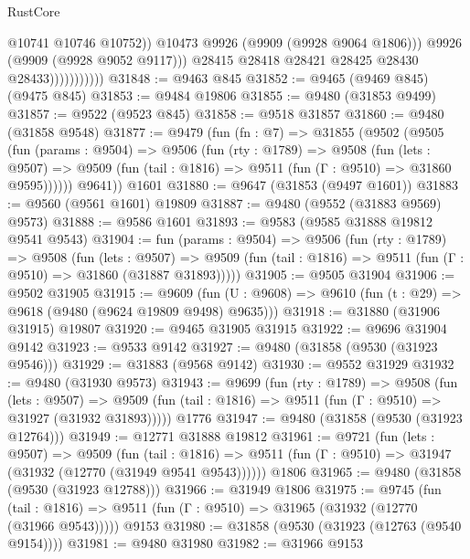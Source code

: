 \begin{lexlean}{RustCore}
\begin{coremodule}
                                  @10741
                                  @10746
                                  @10752))
                              @10473
                              @9926
                              (@9909 (@9928 @9064 @1806)))
                            @9926
                            (@9909 (@9928 @9052 @9117)))
                          @28415
                          @28418
                          @28421
                          @28425
                          @28430
                          @28433)))))))))))
@31848 := @9463 @845
@31852 := @9465 (@9469 @845) (@9475 @845)
@31853 := @9484 @19806
@31855 := @9480 (@31853 @9499)
@31857 := @9522 (@9523 @845)
@31858 := @9518 @31857
@31860 := @9480 (@31858 @9548)
@31877 := @9479
    (fun (fn : @7) =>
    @31855
      (@9502
        (@9505
          (fun (params : @9504) =>
          @9506
            (fun (rty : @1789) =>
            @9508
              (fun (lets : @9507) =>
              @9509 (fun (tail : @1816) => @9511 (fun (Γ : @9510) => @31860 @9595))))))
        @9641))
    @1601
@31880 := @9647 (@31853 (@9497 @1601))
@31883 := @9560 (@9561 @1601) @19809
@31887 := @9480 (@9552 (@31883 @9569) @9573)
@31888 := @9586 @1601
@31893 := @9583 (@9585 @31888 @19812 @9541 @9543)
@31904 := fun (params : @9504) =>
  @9506
    (fun (rty : @1789) =>
    @9508
      (fun (lets : @9507) =>
      @9509 (fun (tail : @1816) => @9511 (fun (Γ : @9510) => @31860 (@31887 @31893)))))
@31905 := @9505 @31904
@31906 := @9502 @31905
@31915 := @9609
    (fun (U : @9608) => @9610 (fun (t : @29) => @9618 (@9480 (@9624 @19809 @9498) @9635)))
@31918 := @31880 (@31906 @31915) @19807
@31920 := @9465 @31905 @31915
@31922 := @9696 @31904 @9142
@31923 := @9533 @9142
@31927 := @9480 (@31858 (@9530 (@31923 @9546)))
@31929 := @31883 (@9568 @9142)
@31930 := @9552 @31929
@31932 := @9480 (@31930 @9573)
@31943 := @9699
    (fun (rty : @1789) =>
    @9508
      (fun (lets : @9507) =>
      @9509 (fun (tail : @1816) => @9511 (fun (Γ : @9510) => @31927 (@31932 @31893)))))
    @1776
@31947 := @9480 (@31858 (@9530 (@31923 @12764)))
@31949 := @12771 @31888 @19812
@31961 := @9721
    (fun (lets : @9507) =>
    @9509
      (fun (tail : @1816) =>
      @9511 (fun (Γ : @9510) => @31947 (@31932 (@12770 (@31949 @9541 @9543))))))
    @1806
@31965 := @9480 (@31858 (@9530 (@31923 @12788)))
@31966 := @31949 @1806
@31975 := @9745
    (fun (tail : @1816) => @9511 (fun (Γ : @9510) => @31965 (@31932 (@12770 (@31966 @9543)))))
    @9153
@31980 := @31858 (@9530 (@31923 (@12763 (@9540 @9154))))
@31981 := @9480 @31980
@31982 := @31966 @9153

\end{coremodule}
\end{lexlean}
